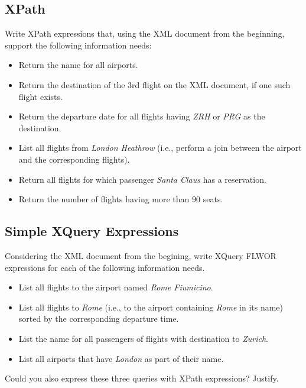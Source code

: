 \documentclass[12pt]{article}
\begin{document}
\subsection{XPath}

Write XPath expressions that, using the XML document from the beginning, support the following information needs:

\begin{itemize}
\item	Return the name for all airports.

\item	Return the destination of the 3rd flight on the XML document, if one such flight exists.

\item	Return the departure date for all flights having {\it ZRH} or {\it PRG} as the destination.

\item	List all flights from {\it London Heathrow} (i.e., perform a join between the airport and the corresponding flights).

\item	Return all flights for which passenger {\it Santa Claus} has a reservation.

\item	Return the number of flights having more than 90 seats.
\end{itemize}

\subsection{Simple XQuery Expressions}

Considering the XML document from the begining, write XQuery FLWOR expressions for each of the following information needs. 

\begin{itemize}
\item List all flights to the airport named {\it Rome Fiumicino}.
\item List all flights to {\it Rome} (i.e., to the airport containing {\it Rome} in its name) sorted by the corresponding departure time.
\item List the name for all passengers of flights with destination to {\it Zurich}.
\item List all airports that have {\it London} as part of their name.
\end{itemize}

Could you also express these three queries with XPath expressions? Justify.
\end{document}
